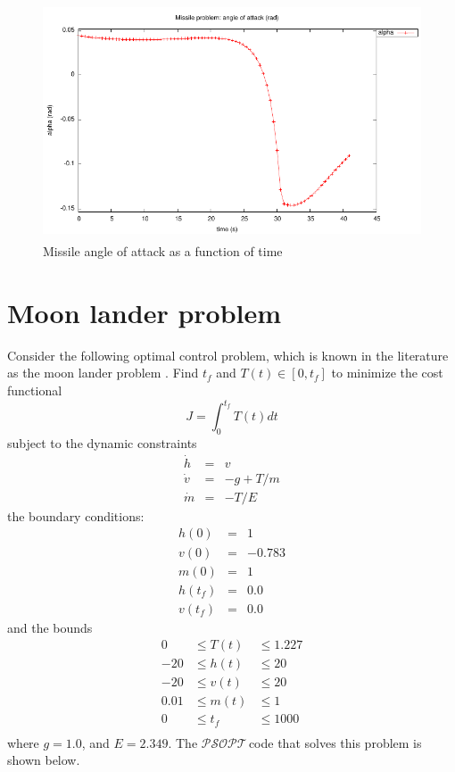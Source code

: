 \documentclass[a4paper,11pt]{report}    %
\newcommand{\psopt}{$\mathcal{PSOPT}$\,}  %
\begin{document}
\begin{figure}[htbp]
 \centerline{\includegraphics[height=7cm]{../examples/missile/missile_alpha}}
\caption{Missile angle of attack as a function of time}\label{missile_alpha}
\end{figure}




\section{Moon lander problem}

Consider the following optimal control problem, which is known in the literature
as the moon lander problem \cite{Rutquist:09}.  Find $t_f$ and $T(t) \in [0, t_f]$ 
to minimize the cost functional
\begin{equation}
  J = \int_{0}^{t_f} T(t) dt
\end{equation}
subject to the dynamic constraints
\begin{equation}
  \begin{array}{lcl}
   \dot h &=& v \\
   \dot v &=& -g + T/m \\
   \dot m &=& -T/E
  \end{array}
\end{equation}
the boundary conditions:
 \begin{equation}
  \begin{array}{lcl}
   h(0) &=& 1 \\
   v(0) &=& -0.783 \\
   m(0) &=& 1 \\
   h(t_f) &=& 0.0  \\
   v(t_f) &=& 0.0
  \end{array}
\end{equation}
and the bounds 
\begin{equation}
\begin{aligned}
  0 &\le T(t) &\le 1.227 \\
 -20 &\le h(t) &\le 20 \\
 -20 &\le v(t) &\le 20 \\
  0.01 &\le m(t) &\le 1 \\
  0 &\le t_f &\le 1000 \\
\end{aligned}
\end{equation}
where $g=1.0$, and $E = 2.349$. The
\psopt code that solves this problem is shown below.  
\end{document}
